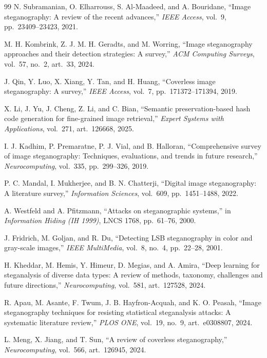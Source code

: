 \documentclass[11pt]{article}
\theoremstyle{definition}
\begin{document}
\begin{thebibliography}{99}
N. Subramanian, O. Elharrouss, S. Al-Maadeed, and A. Bouridane,
``Image steganography: A review of the recent advances,''
\emph{IEEE Access}, vol.~9, pp.~23409--23423, 2021.

M. H. Kombrink, Z. J. M. H. Geradts, and M. Worring,
``Image steganography approaches and their detection strategies: A survey,''
\emph{ACM Computing Surveys}, vol.~57, no.~2, art.~33, 2024.

J. Qin, Y. Luo, X. Xiang, Y. Tan, and H. Huang,
``Coverless image steganography: A survey,''
\emph{IEEE Access}, vol.~7, pp.~171372--171394, 2019.

X. Li, J. Yu, J. Cheng, Z. Li, and C. Bian,
``Semantic preservation-based hash code generation for fine-grained image retrieval,''
\emph{Expert Systems with Applications}, vol.~271, art.~126668, 2025.

I. J. Kadhim, P. Premaratne, P. J. Vial, and B. Halloran,
``Comprehensive survey of image steganography: Techniques, evaluations, and trends in future research,''
\emph{Neurocomputing}, vol.~335, pp.~299--326, 2019.

P. C. Mandal, I. Mukherjee, and B. N. Chatterji,
``Digital image steganography: A literature survey,''
\emph{Information Sciences}, vol.~609, pp.~1451--1488, 2022.

A. Westfeld and A. Pfitzmann,
``Attacks on steganographic systems,''
in \emph{Information Hiding (IH 1999)}, LNCS 1768, pp.~61--76, 2000.

J. Fridrich, M. Goljan, and R. Du,
``Detecting LSB steganography in color and gray-scale images,''
\emph{IEEE MultiMedia}, vol.~8, no.~4, pp.~22--28, 2001.

H. Kheddar, M. Hemis, Y. Himeur, D. Megias, and A. Amira,
``Deep learning for steganalysis of diverse data types: A review of methods, taxonomy, challenges and future directions,''
\emph{Neurocomputing}, vol.~581, art.~127528, 2024.

R. Apau, M. Asante, F. Twum, J. B. Hayfron-Acquah, and K. O. Peasah,
``Image steganography techniques for resisting statistical steganalysis attacks: A systematic literature review,''
\emph{PLOS ONE}, vol.~19, no.~9, art.~e0308807, 2024.

L. Meng, X. Jiang, and T. Sun,
``A review of coverless steganography,''
\emph{Neurocomputing}, vol.~566, art.~126945, 2024.


\end{thebibliography}
\end{document}
